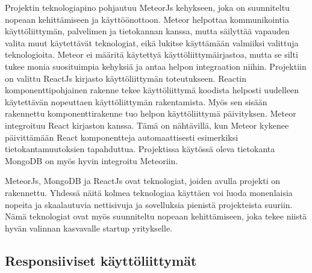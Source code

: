 \documentclass[11pt,a4paper,titlepage,oneside]{article}
\begin{document}
Projektin teknologiapino pohjautuu MeteorJs kehykseen, joka on suunniteltu nopeaan kehittämiseen ja käyttöönottoon.
Meteor helpottaa kommunikointia käyttöliittymän, palvelimen ja tietokannan kanssa, 
mutta säilyttää vapauden valita muut käytettävät teknologiat, eikä lukitse käyttämään valmiiksi valittuja teknologioita.
Meteor ei määritä käytettyä käyttöliittymäirjastoa, mutta se silti tukee monia suosituimpia kehyksiä ja antaa helpon integraation niihin.
Projektiin on valittu ReactJs kirjasto käyttöliittymän toteutukseen.
Reactin komponenttipohjainen rakenne tekee käyttöliittymä koodista helposti uudelleen käytettävän nopeuttaen käyttöliittymän rakentamista. 
Myös sen sisään rakennettu komponenttirakenne tuo helpon käyttöliittymä päivityksen.
Meteor integroituu React kirjaston kanssa.
Tämä on nähtävillä, kun Meteor kykenee päivittämään React komponentteja automaattisesti esimerkiksi tietokantamuutoksien tapahduttua. 
Projektissa käytössä oleva tietokanta MongoDB on myös hyvin integroitu Meteoriin.
\medskip


MeteorJs, MongoDB ja ReactJs ovat teknologiat, joiden avulla projekti on rakennettu.
Yhdessä näitä kolmea teknologiaa käyttäen voi luoda monenlaisia nopeita ja skaalautuvia nettisivuja ja sovelluksia pienistä projekteista suuriin.
Nämä teknologiat ovat myös suunniteltu nopeaan kehittämiseen, joka tekee niistä hyvän valinnan kasvavalle startup yritykselle.
\medskip









\newpage
{}                %




\newpage
{}%






\newpage
{}        %













\newpage
\subsection{Responsiiviset käyttöliittymät}        %
\end{document}
